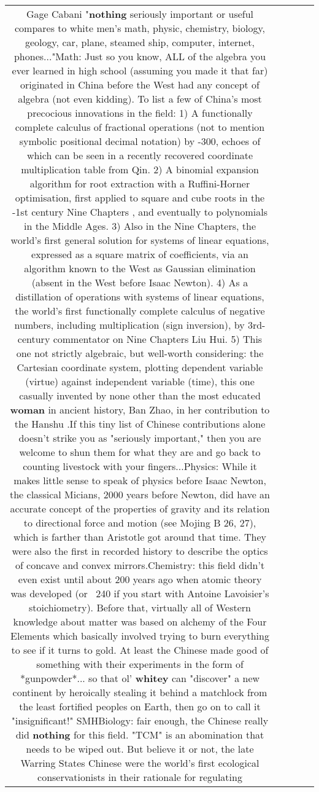 \documentclass[11pt]{article}
\newlength\mylength
\begin{document}
\begin{center}
\begin{longtable}{|C{.65\mylength}|C{.30\mylength}|C{.12\mylength}|C{.12\mylength}|C{.12\mylength}|}
  \small Gage Cabani "\textbf{nothing} seriously important or useful compares to white men's math, physic, chemistry, biology, geology, car, plane, steamed ship, computer, internet, phones..."Math: Just so you know, ALL of the algebra you ever learned in high school (assuming you made it that far) originated in China before the West had any concept of algebra (not even kidding).  To list a few of China's most precocious innovations in the field: 1) A functionally complete calculus of fractional operations (not to mention symbolic positional decimal notation) by -300, echoes of which can be seen in a recently recovered coordinate multiplication table from Qin.  2) A binomial expansion algorithm for root extraction with a Ruffini-Horner optimisation, first applied to square and cube roots in the -1st century Nine Chapters , and eventually to polynomials in the Middle Ages.  3) Also in the Nine Chapters, the world's first general solution for systems of linear equations, expressed as a square matrix of coefficients, via an algorithm known to the West as Gaussian elimination (absent in the West before Isaac Newton).  4) As a distillation of operations with systems of linear equations, the world's first functionally complete calculus of negative numbers, including multiplication (sign inversion), by 3rd-century commentator on  Nine Chapters Liu Hui.  5) This one not strictly algebraic, but well-worth considering: the Cartesian coordinate system, plotting dependent variable (virtue) against independent variable (time), this one casually invented by none other than the most educated \textbf{woman} in ancient history, Ban Zhao, in her contribution to the  Hanshu .If this tiny list of Chinese contributions alone doesn't strike you as "seriously important," then you are welcome to shun them for what they are and go back to counting livestock with your fingers...Physics: While it makes little sense to speak of physics before Isaac Newton, the classical Micians, 2000 years before Newton, did have an accurate concept of the properties of gravity and its relation to directional force and motion (see Mojing B 26, 27), which is farther than Aristotle got around that time.  They were also the first in recorded history to describe the optics of concave and convex mirrors.Chemistry: this field didn't even exist until about 200 years ago when atomic theory was developed (or ~240 if you start with Antoine Lavoisier's stoichiometry).  Before that, virtually all of Western knowledge about matter was based on alchemy of the Four Elements which basically involved trying to burn everything to see if it turns to gold.  At least the Chinese made good of something with their experiments in the form of *gunpowder*... so that ol' \textbf{whitey} can "discover" a new continent by heroically stealing it behind a matchlock from the least fortified peoples on Earth, then go on to call it "insignificant!"  SMHBiology: fair enough, the Chinese really did \textbf{nothing} for this field.  "TCM" is an abomination that needs to be wiped out.  But believe it or not, the late Warring States Chinese were the world's first ecological conservationists in their rationale for regulating 
\end{longtable}
\end{center}
\end{document}
